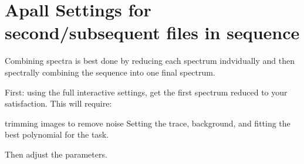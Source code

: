 \documentclass[letter,11pt,oneside]{article}
\newcommand{\dhl}[1]{{\color{verbcolor}{\texttt#1}}}
\begin{document}
\section{Apall Settings for second/subsequent files in sequence}

Combining spectra is best done by reducing each spectrum indvidually
and then spectrally combining \dhl{scombine} the sequence into one final
spectrum.

First: using the full interactive settings, get the first spectrum reduced
to your satisfaction. This will require:

trimming images to remove noise
Setting the trace, background, and fitting the best polynomial for the task.

Then adjust the parameters.

\begingroup \fontsize{10pt}{10pt}
\selectfont
\end{document}
